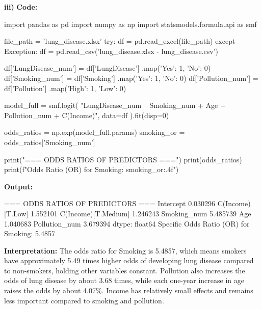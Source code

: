 \documentclass[12pt,a4paper]{article}
\begin{document}
\textbf{iii)}
\textbf{Code:}
\begin{codebox}
import pandas as pd
import numpy as np
import statsmodels.formula.api as smf

file_path = 'lung_disease.xlsx'
try:
    df = pd.read_excel(file_path)
except Exception:
    df = pd.read_csv('lung_disease.xlsx - lung_disease.csv')

df['LungDisease_num'] = df['LungDisease']
.map({'Yes': 1, 'No': 0})
df['Smoking_num'] = df['Smoking']
.map({'Yes': 1, 'No': 0})
df['Pollution_num'] = df['Pollution']
.map({'High': 1, 'Low': 0})

model_full = smf.logit(
    "LungDisease_num ~ Smoking_num + Age + 
    Pollution_num + C(Income)",
    data=df
).fit(disp=0)

odds_ratios = np.exp(model_full.params)
smoking_or = odds_ratios['Smoking_num']

print("=== ODDS RATIOS OF PREDICTORS ===")
print(odds_ratios)
print(f"\nSpecific Odds Ratio (OR) for Smoking: {smoking_or:.4f}")
\end{codebox}

\textbf{Output:}
\begin{codebox}
=== ODDS RATIOS OF PREDICTORS ===
Intercept 0.030296
C(Income)[T.Low] 1.552101
C(Income)[T.Medium] 1.246243
Smoking_num 5.485739
Age 1.040683
Pollution_num 3.679394
dtype: float64
Specific Odds Ratio (OR) for Smoking: 5.4857
\end{codebox}

\textbf{Interpretation:}
The odds ratio for Smoking is 5.4857, which means smokers have approximately 5.49 times higher odds of developing lung disease compared to non-smokers, holding other variables constant.
Pollution also increases the odds of lung disease by about 3.68 times, while each one-year increase in age raises the odds by about 4.07\%.
Income has relatively small effects and remains less important compared to smoking and pollution.
\end{document}
